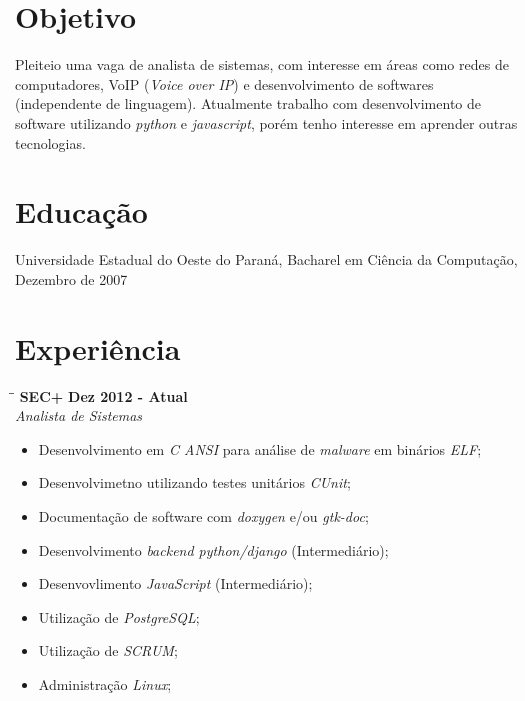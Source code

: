\documentclass[margin]{res}
\begin{document}
  

\address{Florianopolis,  Brasil \\ benatto@gmail.com \\ +55 (48)99767365 }
                           
                        
\begin{resume}                        
 
\section{Objetivo}	Pleiteio uma vaga de analista de sistemas, com interesse em áreas como redes de 
			computadores, VoIP (\textit{Voice over IP}) e desenvolvimento de softwares (independente de linguagem).
			Atualmente trabalho com desenvolvimento de software utilizando \textit{python} e \textit{javascript}, porém tenho interesse
			em aprender outras tecnologias.
 
\section{Educação}	Universidade Estadual do Oeste do Paraná, Bacharel em Ciência da Computação, Dezembro de 2007
  
\section{Experiência}      

\vspace{-0.1in}
   \begin{tabbing}
   \hspace{2.3in}\= \hspace{1.7in}\= \kill %
    \textbf{SEC+}    \>\>\textbf{Dez 2012 - Atual}\\
    \textit{Analista de Sistemas}                         
   \end{tabbing}\vspace{-20pt}      %
    \vspace{5mm}
    \begin{itemize}
     \item Desenvolvimento em \textit{C ANSI} para análise de \textit{malware} em binários \textit{ELF};
     \item Desenvolvimetno utilizando testes unitários \textit{CUnit};
     \item Documentação de software com \textit{doxygen} e/ou \textit{gtk-doc};
     \item Desenvolvimento \textit{backend python/django} (Intermediário);
     \item Desenvovlimento \textit{JavaScript} (Intermediário);
     \item Utilização de \textit{PostgreSQL};
     \item Utilização de \textit{SCRUM}; 
     \item Administração \textit{Linux};
    \end{itemize}



\end{resume}
\end{document}
